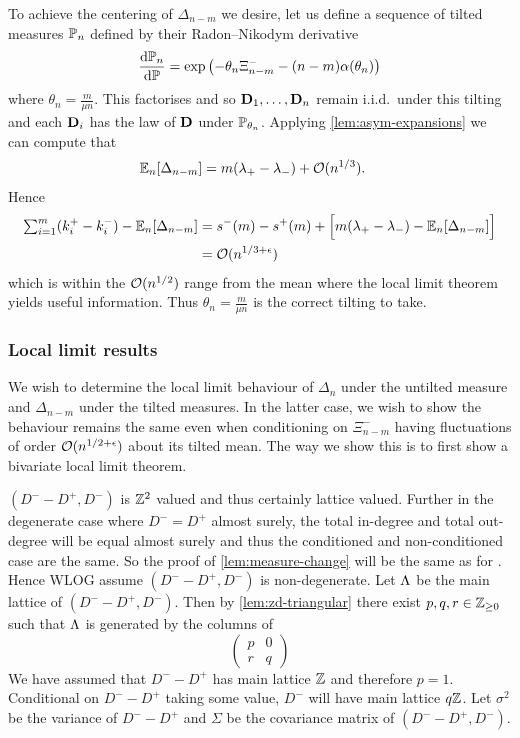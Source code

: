 To achieve the centering of $\Delta_{n-m}$ we desire, let us define a sequence of tilted measures $\P_n$ defined by their Radon--Nikodym derivative
\begin{equation}
    \diff{\P_n}{\P} = \exp \left( - \theta_n \Xi^-_{n-m} - (n - m) \alpha(\theta_n) \right)
\end{equation}
where $\theta_n = \frac{m}{\mu n}$. This factorises and so $\vD_1, \ldots, \vD_n$ remain i.i.d.\ under this tilting and each $\vD_i$ has the law of $\vD$ under $\P_{\theta_n}$. Applying \cref{lem:asym-expansions} we can compute that
\begin{align*}
    \E_n[\Delta_{n-m}] 
    &= m(\lambda_+ - \lambda_-) + \bigo(n^{1/3}).
\end{align*}
Hence
\begin{align*}
    \textstyle \sum_{i=1}^m (k_i^+ - k_i^-) - \E_n[\Delta_{n-m}] 
    &= s^-(m) - s^+(m) + \Big[ m(\lambda_+ - \lambda_-) - \E_n[\Delta_{n-m}] \Big] \\
    &= \bigo(n^{1/3 + \epsilon})
\end{align*}
which is within the $\bigo(n^{1/2})$ range from the mean where the local limit theorem yields useful information. Thus $\theta_n = \frac{m}{\mu n}$ is the correct tilting to take. 

\subsubsection{Local limit results}

We wish to determine the local limit behaviour of $\Delta_n$ under the untilted measure and $\Delta_{n-m}$ under the tilted measures. In the latter case, we wish to show the behaviour remains the same even when conditioning on $\Xi_{n-m}^-$ having fluctuations of order $\bigo(n^{1/2 + \epsilon})$ about its tilted mean. The way we show this is to first show a bivariate local limit theorem.

$(D^- - D^+, D^-)$ is $\Z^2$ valued and thus certainly lattice valued. Further in the degenerate case where $D^- = D^+$ almost surely, the total in-degree and total out-degree will be equal almost surely and thus the conditioned and non-conditioned case are the same. So the proof of \cref{lem:measure-change} will be the same as for \cite[Proposition 4.3]{conchon--kerjanStableGraphMetric2020}. Hence WLOG assume $(D^- - D^+, D^-)$ is non-degenerate. Let $\lattice$ be the main lattice of $(D^- - D^+, D^-)$. Then by \cref{lem:zd-triangular} there exist $p, q, r \in \Z_{\geq 0}$ such that $\lattice$ is generated by the columns of
\begin{equation*}
    \begin{pmatrix}
        p & 0 \\
        r & q
    \end{pmatrix}
\end{equation*}
We have assumed that $D^- - D^+$ has main lattice $\Z$ and therefore $p = 1$. Conditional on $D^- - D^+$ taking some value, $D^-$ will have main lattice $q \Z$. Let $\sigma^2$ be the variance of $D^- - D^+$ and $\Sigma$ be the covariance matrix of $(D^- - D^+, D^-)$.

